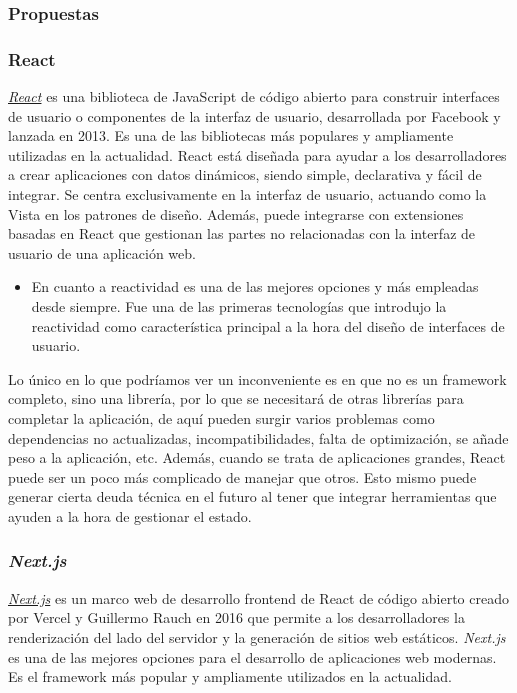 \subsubsection{Propuestas}

\subsubsection{React}

\href{https://react.dev/}{\textit{React}} es una biblioteca de JavaScript de código abierto para construir interfaces de usuario o componentes de la interfaz de usuario, desarrollada por Facebook y lanzada en 2013. Es una de las bibliotecas más populares y ampliamente utilizadas en la actualidad. React está diseñada para ayudar a los desarrolladores a crear aplicaciones con datos dinámicos, siendo simple, declarativa y fácil de integrar. Se centra exclusivamente en la interfaz de usuario, actuando como la Vista en los patrones de diseño. Además, puede integrarse con extensiones basadas en React que gestionan las partes no relacionadas con la interfaz de usuario de una aplicación web. 

\begin{itemize}
  \item[\bien] En cuanto a reactividad es una de las mejores opciones y más empleadas desde siempre. Fue una de las primeras tecnologías que introdujo la reactividad como característica principal a la hora del diseño de interfaces de usuario.
\end{itemize}

Lo único en lo que podríamos ver un inconveniente es en que no es un framework completo, sino una librería, por lo que se necesitará de otras librerías para completar la aplicación, de aquí pueden surgir varios problemas como dependencias no actualizadas, incompatibilidades, falta de optimización, se añade peso a la aplicación, etc. Además, cuando se trata de aplicaciones grandes, React puede ser un poco más complicado de manejar que otros. Esto mismo puede generar cierta deuda técnica en el futuro al tener que integrar herramientas que ayuden a la hora de gestionar el estado.

\subsubsection{\textit{Next.js}}

\href{https://nextjs.org/}{\textit{Next.js}} es un marco web de desarrollo frontend de React de código abierto creado por Vercel y Guillermo Rauch en 2016 que permite a los desarrolladores la renderización del lado del servidor y la generación de sitios web estáticos. \textit{Next.js} es una de las mejores opciones para el desarrollo de aplicaciones web modernas. Es el framework más popular y ampliamente utilizados en la actualidad.

